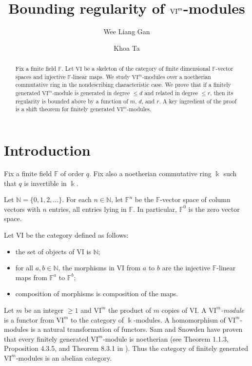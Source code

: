 \documentclass{amsart}
\title{Bounding regularity of $\VI^m$-modules}
\author{Wee Liang Gan}
\author{Khoa Ta}
\numberwithin{equation}{section}
\newcommand{\N}{{\mathbb{N}}}
\newcommand{\F}{{\mathbb{F}}}
\newcommand{\VI}{{\mathrm{VI}}}
\begin{document}
\begin{abstract}
   Fix a finite field $\F$. Let $\VI$ be a skeleton of the category of finite dimensional $\F$-vector spaces and injective $\F$-linear maps. We study $\VI^m$-modules over a noetherian commutative ring in the nondescribing characteristic case. We prove that if a finitely generated $\VI^m$-module is generated in degree $\leqslant d$ and related in degree $\leqslant r$, then its regularity is bounded above by a function of $m$, $d$, and $r$. A key ingredient of the proof is a shift theorem for finitely generated $\VI^m$-modules.
\end{abstract}

\maketitle



 

\section*{Introduction} 

Fix a finite field $\F$ of order $q$. Fix also a noetherian commutative ring $\Bbbk$ such that $q$ is invertible in $\Bbbk$. 

Let $\N=\{0, 1, 2, \ldots\}$. For each $n\in \N$, let $\F^n$ be the $\F$-vector space of column vectors with $n$ entries, all entries lying in $\F$. In particular, $\F^0$ is the zero vector space. 

Let $\VI$ be the category defined as follows:
\begin{itemize}
   \item the set of objects of $\VI$ is $\N$;
   \item for all $a, b\in \N$, the morphisms in $\VI$ from $a$ to $b$ are the injective $\F$-linear maps from $\F^a$ to $\F^b$;
   \item composition of morphisms is composition of the maps.
\end{itemize} 
Let $m$ be an integer $\geqslant 1$ and $\VI^m$ the product of $m$ copies of $\VI$. A \emph{$\VI^m$-module} is a functor from $\VI^m$ to the category of $\Bbbk$-modules. A homomorphism of $\VI^m$-modules is a natural transformation of functors. Sam and Snowden have proven that every finitely generated $\VI^m$-module is noetherian (see Theorem 1.1.3, Proposition 4.3.5, and Theorem 8.3.1 in \cite{sams}). Thus the category of finitely generated $\VI^m$-modules is an abelian category. 
\end{document}
